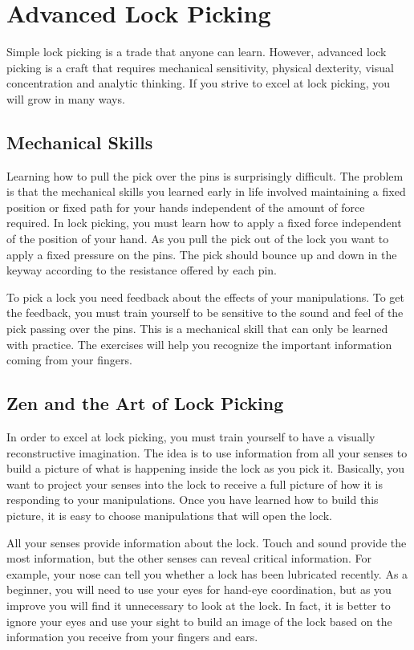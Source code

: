 \chapter{Advanced Lock Picking}
Simple lock picking is a trade that anyone can learn. However, advanced lock picking is a craft that
requires mechanical sensitivity, physical dexterity, visual concentration and analytic thinking. If
you strive to excel at lock picking, you will grow in many ways.

\section{Mechanical Skills}
Learning how to pull the pick over the pins is surprisingly difficult. The problem is that the
mechanical skills you learned early in life involved maintaining a fixed position or fixed path
for your hands independent of the amount of force required. In lock picking, you must learn
how to apply a fixed force independent of the position of your hand. As you pull the pick
out of the lock you want to apply a fixed pressure on the pins. The pick should bounce up
and down in the keyway according to the resistance offered by each pin.

To pick a lock you need feedback about the effects of your manipulations. To get the
feedback, you must train yourself to be sensitive to the sound and feel of the pick passing
over the pins. This is a mechanical skill that can only be learned with practice. The exercises
will help you recognize the important information coming from your fingers.

\section{Zen and the Art of Lock Picking}
In order to excel at lock picking, you must train yourself to have a visually reconstructive
imagination. The idea is to use information from all your senses to build a picture of what
is happening inside the lock as you pick it. Basically, you want to project your senses into
the lock to receive a full picture of how it is responding to your manipulations. Once you
have learned how to build this picture, it is easy to choose manipulations that will open the
lock.

All your senses provide information about the lock. Touch and sound provide the most
information, but the other senses can reveal critical information. For example, your nose
can tell you whether a lock has been lubricated recently. As a beginner, you will need to use your
eyes for hand-eye coordination, but as you improve you will find it unnecessary to look
at the lock. In fact, it is better to ignore your eyes and use your sight to build an image of
the lock based on the information you receive from your fingers and ears.


